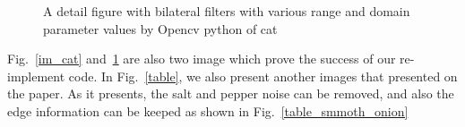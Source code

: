 \documentclass[12pt]{article}
\begin{document}
\begin{figure}[H]
  \quad
  \quad
  \quad
  \caption{A detail figure with bilateral filters with various range and domain parameter values by Opencv python of cat}
  \label{py_cat}
  \end{figure}

Fig.~\ref{im_cat} and~\ref{py_cat} are also two image which prove the success of our re-implement code. 
In Fig.~\ref{table}, we also present another images that presented on the paper. 
As it presents, the salt and pepper noise can be removed, and also the edge information can be keeped as shown in Fig.~\ref{table_smmoth_onion} 
\end{document}
